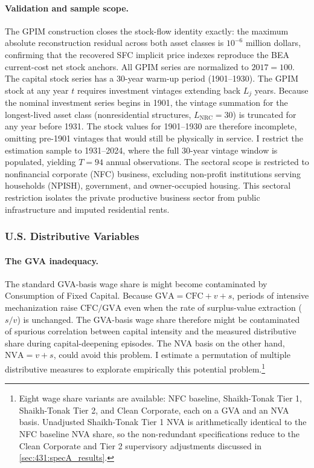 \paragraph{Validation and sample scope.}
The GPIM construction closes the stock-flow identity exactly: the
maximum absolute reconstruction residual across both asset classes
is $10^{-6}$ million dollars, confirming that the recovered SFC
implicit price indexes reproduce the BEA current-cost net stock
anchors. All GPIM series are normalized to $2017 = 100$.
The capital stock series has a 30-year warm-up period (1901--1930).
The GPIM stock at any year $t$ requires investment vintages
extending back $L_j$ years. Because the nominal investment series
begins in 1901, the vintage summation for the longest-lived asset
class (nonresidential structures, $L_{\text{NRC}} = 30$) is
truncated for any year before 1931. The stock values for
1901--1930 are therefore incomplete, omitting pre-1901 vintages
that would still be physically in service. I restrict the
estimation sample to 1931--2024, where the full 30-year vintage
window is populated, yielding $T = 94$ annual observations.
The sectoral scope is restricted to nonfinancial corporate (NFC)
business, excluding non-profit institutions serving households
(NPISH), government, and owner-occupied housing. This sectoral
restriction isolates the private productive business sector from
public infrastructure and imputed residential rents.

\subsubsection{U.S. Distributive Variables}
\label{sec:413:us_distrib}

\paragraph{The GVA inadequacy.}
The standard GVA-basis wage share is might become contaminated by
Consumption of Fixed Capital. Because $\text{GVA} = \text{CFC} + v
+ s$, periods of intensive mechanization raise
$\text{CFC}/\text{GVA}$ even when the rate of surplus-value
extraction ($s/v$) is unchanged. The GVA-basis wage share therefore
might be contaminated of spurious correlation between capital intensity and the measured distributive share during capital-deepening episodes. The NVA basis on the other hand, $\text{NVA} = v + s$, could avoid this problem. I estimate a permutation of multiple distributive measures to explorate empirically this potential problem.\footnote{Eight wage share variants are
	available: NFC baseline, Shaikh-Tonak Tier 1, Shaikh-Tonak Tier 2,
	and Clean Corporate, each on a GVA and an NVA basis. Unadjusted
	Shaikh-Tonak Tier 1 NVA is arithmetically identical to the NFC
	baseline NVA share, so the non-redundant specifications reduce to
	the Clean Corporate and Tier 2 supervisory adjustments discussed in
	\cref{sec:431:specA_results}.}

